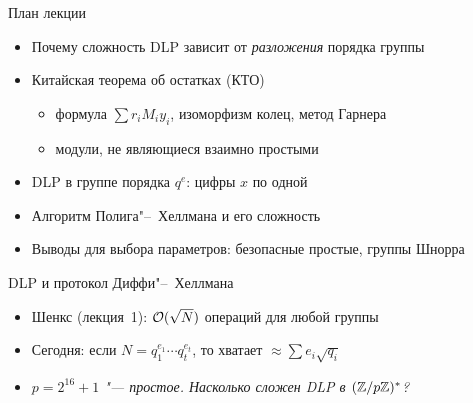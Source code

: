 \documentclass{ca-slides}
\author{}
\begin{document}
\titleframe

\begin{canvasframe}{План лекции}
  \begin{itemize}
    \item Почему сложность DLP зависит от \emph{разложения} порядка группы
    \item Китайская теорема об остатках (КТО)
    \begin{itemize}
      \item формула $\sum r_i M_i y_i$, изоморфизм колец, метод Гарнера
      \item модули, не являющиеся взаимно простыми
    \end{itemize}
    \item DLP в группе порядка $q^e$: цифры $x$ по одной
    \item Алгоритм Полига"--~Хеллмана и его сложность
    \item Выводы для выбора параметров: безопасные простые, группы Шнорра
  \end{itemize}
\end{canvasframe}

\begin{canvasframe}{DLP и протокол Диффи"--~Хеллмана}
  \centering
  \begin{itemize}
    \item Шенкс (лекция~1): $\mathcal{O}(\sqrt N)$ операций для любой группы
    \item \alert{Сегодня}: если $N = q_1^{e_1} \cdots q_t^{e_t}$, то хватает
      $\approx \sum e_i \sqrt{q_i}$
    \item[\textcolor{caRed}{?}] \textcolor{caRed}{\itshape $p = 2^{16} + 1$ "--- простое. Насколько сложен DLP в $(\mathbb{Z}/p\mathbb{Z})^{*}$?}
  \end{itemize}
\end{canvasframe}
\end{document}
